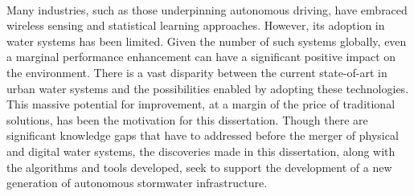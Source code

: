\

Many industries, such as those underpinning autonomous driving, have embraced wireless sensing and statistical learning approaches.
However, its adoption in water systems has been limited. Given the number of such systems globally, even a marginal performance enhancement can have a significant positive impact on the environment.
There is a vast disparity between the current state-of-art in urban water systems and the possibilities enabled by adopting these technologies.
This massive potential for improvement, at a margin of the price of traditional solutions, has been the motivation for this dissertation.
Though there are significant knowledge gaps that have to addressed before the merger of physical and digital water systems, the discoveries made in this dissertation, along with the algorithms and tools developed, seek to support the development of a new generation of autonomous stormwater infrastructure.
